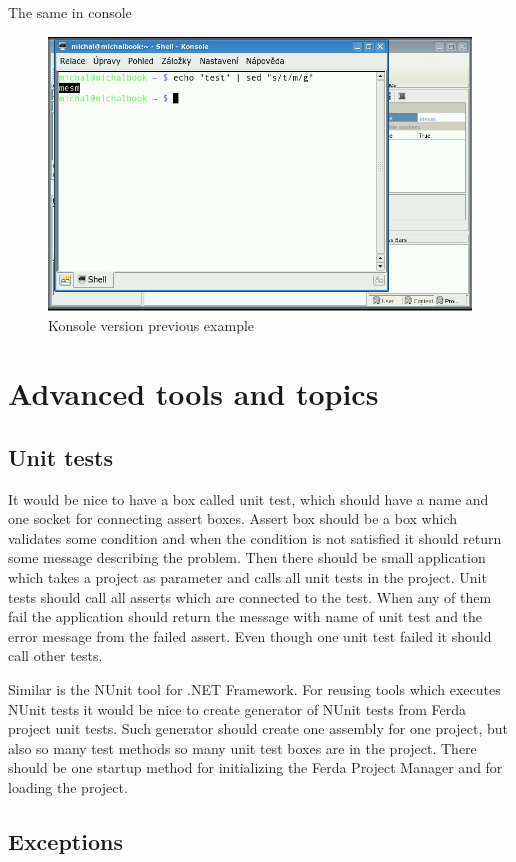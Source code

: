 \documentclass[a4paper,12pt]{book}
\begin{document}
The same in console
\begin{figure}
	\includegraphics[width=13.72cm]{command3.png}
	\caption{Konsole version previous example}
\end{figure}
\section{Advanced tools and topics}
\subsection{Unit tests}
It would be nice to have a box called unit test, which should have a name and one socket for connecting assert boxes. Assert box should be a box which validates some condition and when the condition is not satisfied it should return some message describing the problem. Then there should be small application which takes a project as parameter and calls all unit tests in the project. Unit tests should call all asserts which are connected to the test. When any of them fail the application should return the message with name of unit test and the error message from the failed assert. Even though one unit test failed it should call other tests.

Similar is the NUnit tool for .NET Framework. For reusing tools which executes NUnit tests it would be nice to create generator of NUnit tests from Ferda project unit tests. Such generator should create one assembly for one project, but also so many test methods so many unit test boxes are in the project. There should be one startup method for initializing the Ferda Project Manager and for loading the project. 

\subsection{Exceptions}
\end{document}
